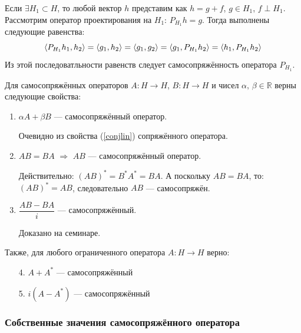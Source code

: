 \documentclass[12pt]{article}
\begin{document}
			\example Если $\exists H_1 \subset H$, то любой вектор $h$ представим как $h = g+f$, $g \in H_1$, $f\perp H_1$.
			Рассмотрим оператор проектирования на $H_1$: $P_{H_1}h = g$. Тогда выполнены следующие равенства:
			$$\left\langle P_{H_1}h_1, h_2 \right\rangle = \left\langle g_1, h_2 \right\rangle = \left\langle g_1, g_2 \right\rangle = \left\langle g_1, P_{H_1}h_2 \right\rangle = \left\langle h_1, P_{H_1}h_2 \right\rangle$$
			Из этой последоватльности равенств следует самосопряжённость оператора $P_{H_1}$.
	
			Для самосопряжённых операторов $A : H \rightarrow H$, $B : H \rightarrow H$ и чисел $\alpha,\, \beta \in \mathbb{R}$ верны следующие
			свойства:
			\begin{enumerate}
				\item $\alpha A + \beta B$ --- самосопряжённый оператор.

				Очевидно из свойства (\ref{conjlin}) сопряжённого оператора.
		
				\item $AB = BA$ $\Rightarrow$ $AB$ --- самосопряжённый оператор.

				Действительно: $(AB)^* = B^* A^* = BA$. А поскольку $AB = BA$, то: $(AB)^* = AB$,
				следовательно $AB$ --- самосопряжён.
		
				\item $\dfrac{AB - BA}{i}$ --- самосопряжённый.

				{\color{gray}
				Доказано на семинаре.
				}
			\end{enumerate}
			Также, для любого ограниченного оператора $A: H \rightarrow H$ верно:
			\begin{enumerate}
				\item[4.] $A+A^{*}$ --- самосопряжённый
				\item[5.] $i(A-A^{*})$ --- самосопряжённый
			\end{enumerate}
	
		\subsubsection{Собственные значения самосопряжённого оператора}
	
\end{document}
